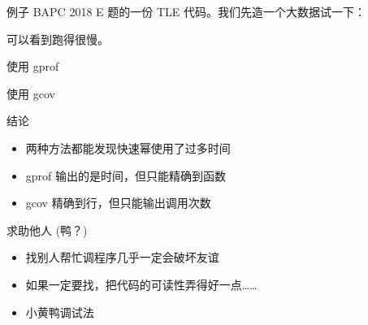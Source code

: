 \documentclass[10pt,mathserif]{beamer}
\begin{document}
\begin{frame}{例子}
	BAPC 2018 E 题的一份 TLE 代码。我们先造一个大数据试一下：
	
	可以看到跑得很慢。
\end{frame}

\begin{frame}{使用 gprof}
	
\end{frame}

\begin{frame}[allowframebreaks]{使用 gcov}
	
\end{frame}

\begin{frame}{结论}
	\begin{itemize}
		\item 两种方法都能发现快速幂使用了过多时间
		\item gprof 输出的是时间，但只能精确到函数
		\item gcov 精确到行，但只能输出调用次数
	\end{itemize}
\end{frame}

\begin{frame}{求助他人 (鸭？)}
	\begin{itemize}
		\item 找别人帮忙调程序几乎一定会破坏友谊
		\item 如果一定要找，把代码的可读性弄得好一点……
		\item 小黄鸭调试法
	\end{itemize}
\end{frame}

{\xdbg%
\begin{frame}
\end{frame}}
\end{document}
